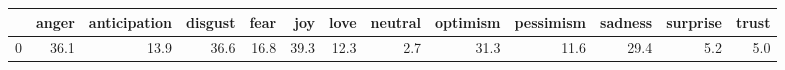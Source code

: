 \begin{tabular}{lrrrrrrrrrrrr}
\toprule
{} &  anger &  anticipation &  disgust &  fear &   joy &  love &  neutral &  optimism &  pessimism &  sadness &  surprise &  trust \\
\midrule
0 &   36.1 &          13.9 &     36.6 &  16.8 &  39.3 &  12.3 &      2.7 &      31.3 &       11.6 &     29.4 &       5.2 &    5.0 \\
\bottomrule
\end{tabular}
